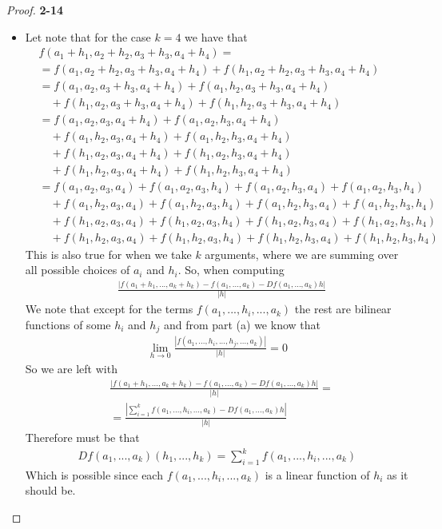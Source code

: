 \documentclass[11pt]{article}
\theoremstyle{definition}
\begin{document}
\begin{proof}{\textbf{2-14}}
\begin{itemize}
\item [(b)] Let note that for the case $k = 4$ we have that
\begin{align*}
    &f(a_1 + h_1, a_2 + h_2, a_3 + h_3, a_4 + h_4) = \\
    &= f(a_1, a_2 + h_2, a_3 + h_3, a_4 + h_4)
    + f(h_1, a_2 + h_2, a_3 + h_3, a_4 + h_4)\\
    &= f(a_1, a_2, a_3 + h_3, a_4 + h_4)
    + f(a_1, h_2, a_3 + h_3, a_4 + h_4)\\
    &\quad+ f(h_1, a_2, a_3 + h_3, a_4 + h_4)
    + f(h_1, h_2, a_3 + h_3, a_4 + h_4)\\
    &= f(a_1, a_2, a_3, a_4 + h_4)
    + f(a_1, a_2, h_3, a_4 + h_4)\\
    &\quad + f(a_1, h_2, a_3, a_4 + h_4)
    + f(a_1, h_2, h_3, a_4 + h_4)\\
    &\quad+ f(h_1, a_2, a_3, a_4 + h_4)
    + f(h_1, a_2, h_3, a_4 + h_4)\\
    &\quad+ f(h_1, h_2, a_3 , a_4 + h_4)
    + f(h_1, h_2, h_3, a_4 + h_4)\\
    &= f(a_1, a_2, a_3, a_4) + f(a_1, a_2, a_3, h_4)
    + f(a_1, a_2, h_3, a_4) + f(a_1, a_2, h_3, h_4)\\
    &\quad + f(a_1, h_2, a_3, a_4) + f(a_1, h_2, a_3, h_4)
    + f(a_1, h_2, h_3, a_4) + f(a_1, h_2, h_3, h_4)\\
    &\quad + f(h_1, a_2, a_3, a_4) + f(h_1, a_2, a_3, h_4)
    + f(h_1, a_2, h_3, a_4) + f(h_1, a_2, h_3, h_4)\\
    &\quad + f(h_1, h_2, a_3, a_4) + f(h_1, h_2, a_3, h_4)
    + f(h_1, h_2, h_3, a_4) + f(h_1, h_2, h_3, h_4)
\end{align*}
This is also true for when we take $k$ arguments, where
we are summing over all possible choices of $a_i$ and $h_i$.
So, when computing 
\begin{align*}
   &\frac{|f(a_1 + h_1, ..., a_k + h_k)
    - f(a_1, ..., a_k) - Df(a_1, ..., a_k)h|}{|h|}
\end{align*}
We note that except for the terms $f(a_1, ..., h_i, ..., a_k)$ the rest
are bilinear functions of some $h_i$ and $h_j$ and from part (a) we know that
\begin{align*}
    \lim_{h\to 0} \frac{|f(a_1, ..., h_i, ..., h_j, ..., a_k)|}{|h|} = 0
\end{align*}
So we are left with 
\begin{align*}
   &\frac{|f(a_1 + h_1, ..., a_k + h_k)
    - f(a_1, ..., a_k) - Df(a_1, ..., a_k)h|}{|h|} =\\
    &= \frac{|\sum_{i=1}^k f(a_1, ..., h_i, ..., a_k) - Df(a_1, ..., a_k)h|}{|h|}
\end{align*}
Therefore must be that
\begin{align*}
    Df(a_1, ..., a_k)(h_1, ..., h_k) = \sum_{i=1}^k f(a_1, ..., h_i, ..., a_k)
\end{align*}
Which is possible since each $f(a_1, ..., h_i, ..., a_k)$ is a linear function
of $h_i$ as it should be.
\end{itemize}
\end{proof}
\end{document}
